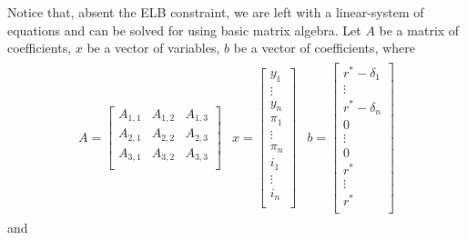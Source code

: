 \documentclass[11pt]{article}
\begin{document}
\begin{singlespace}
		Notice that, absent the ELB constraint, we are left with a linear-system of equations and can be solved for using basic matrix algebra. Let $A$ be a matrix of coefficients, $x$ be a vector of variables, $b$ be a vector of coefficients, where 
		\begin{align*}
		\begin{array}{ccc}
		A = 
		\begin{bmatrix}
		A_{1,1} & A_{1,2} & A_{1,3} \\
		A_{2,1} & A_{2,2} & A_{2,3} \\
		A_{3,1} & A_{3,2} & A_{3,3} \\
		\end{bmatrix} & 
		x =
		\begin{bmatrix}
		y_1\\
		\vdots\\
		y_n\\
		\pi_1\\
		\vdots\\
		\pi_n\\
		i_1\\
		\vdots\\
		i_n\\
		\end{bmatrix}& 
		b =
		\begin{bmatrix}
		r^* - \delta_1\\
		\vdots\\
		r^* - \delta_n\\
		0\\
		\vdots\\
		0\\
		r^* \\
		\vdots\\
		r^* \\			
		\end{bmatrix}
		\end{array}
		\end{align*}
		and
		

\end{singlespace}
\end{document}
